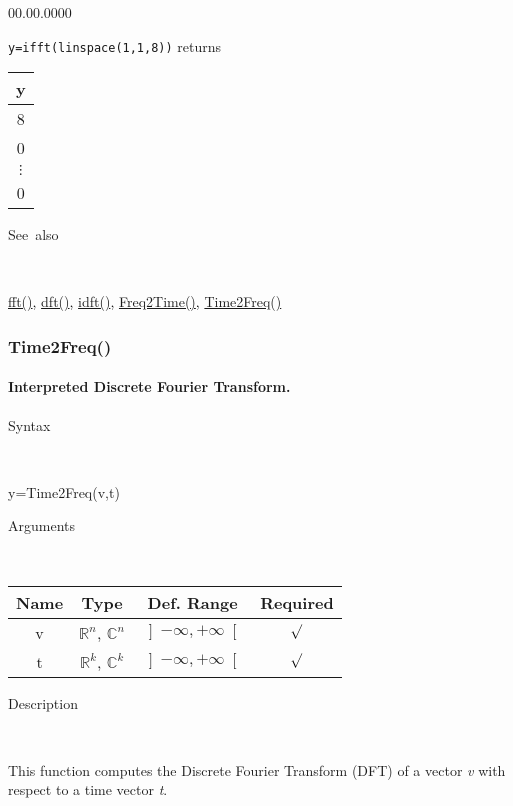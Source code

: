 \begin{lyxlist}{00.00.0000}
\item [\texttt{y=ifft(linspace(1,1,8))}]returns \begin{tabular}{|c|}
\hline 
y\tabularnewline
\hline
\hline 
8\tabularnewline
\hline 
0\tabularnewline
\hline 
$\vdots$\tabularnewline
\hline 
0\tabularnewline
\hline
\end{tabular}
\end{lyxlist}
\begin{description}
\item [See~also]~
\end{description}
\textcolor{blue}{\hyperlink{fft}{fft()}}\textcolor{black}{,} \textcolor{blue}{\hyperlink{dft}{dft()}}\textcolor{black}{,}
\textcolor{blue}{\hyperlink{idft}{idft()}}\textcolor{black}{,}
\textcolor{blue}{\hyperlink{Freq2Time}{Freq2Time()}}\textcolor{black}{,}
\textcolor{blue}{\hyperlink{Time2Freq}{Time2Freq()}}

\newpage
\subsubsection*{\hypertarget{Time2Freq}{}{\Large Time2Freq()}}


\paragraph{\label{par:Interpreted-Discrete-Fourier-Transform}Interpreted Discrete Fourier Transform.}

\begin{description}
\item [Syntax]~
\end{description}
y=Time2Freq(v,t)

\begin{description}
\item [Arguments]~
\end{description}
\begin{tabular}{|c|c|c|c|}
\hline 
Name&
Type&
Def. Range&
Required\tabularnewline
\hline
\hline 
v&
$\mathbb{R}^{n}$, $\mathbb{C}^{n}$&
$\left]-\infty,+\infty\right[$&
$\surd$\tabularnewline
\hline 
t&
$\mathbb{R}^{k}$, $\mathbb{C}^{k}$&
$\left]-\infty,+\infty\right[$&
$\surd$\tabularnewline
\hline
\end{tabular}

\begin{description}
\item [Description]~
\end{description}
This function computes the Discrete Fourier Transform (DFT) of a vector
\textit{v} with respect to a time vector \textit{t}.

